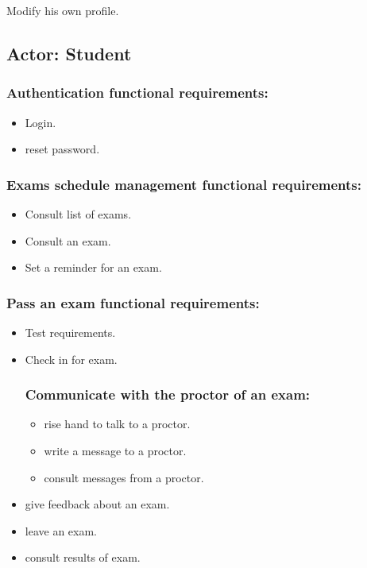 \documentclass[a4paper,12p]{article}
\begin{document}
     \item Modify his own profile.

     \subsection{Actor: Student}
     \subsubsection{Authentication functional requirements:}
     \begin{itemize}
         \item Login.
         \item reset password.
     \end{itemize}

     \subsubsection{Exams schedule management functional requirements:}
     \begin{itemize}
         \item Consult list of exams.
         \item Consult an exam.
         \item Set a reminder for an exam.
     \end{itemize}

     \subsubsection{Pass an exam functional requirements:}
     \begin{itemize}
         \item Test requirements.
         \item Check in for exam.
         \subsubsection{Communicate with the proctor of an exam:}
         \begin{itemize}
             \item rise hand to talk to a proctor.
             \item write a message to a proctor.
             \item consult messages from a proctor.
         \end{itemize}

         \item give feedback about an exam.
         \item leave an exam.
         \item consult results of exam.
     \end{itemize}
\end{document}
